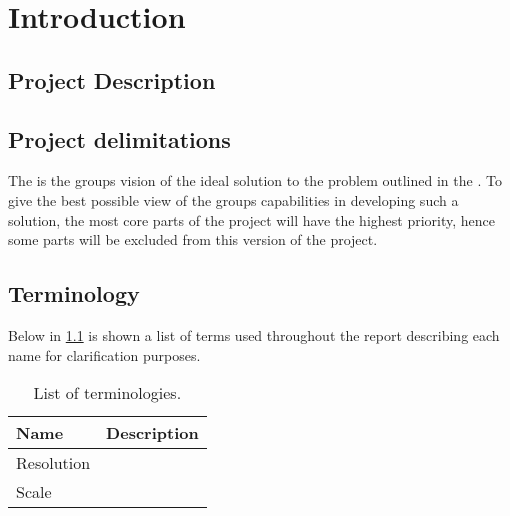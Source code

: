 
\chapter{Introduction}
\label{sec:introduction}


\section{Project Description}
\label{sec:projectDescription}


\section{Project delimitations}
\label{sec:delimitations}
The  is the groups vision of the ideal solution to the problem outlined in the .  
To give the best possible view of the groups capabilities in developing such a solution, the most core parts of the project will have the highest priority, hence some parts will be excluded from this version of the project. 

\section{Terminology}
\label{sec:terminology}
Below in \cref{tab:terminology} is shown a list of terms used throughout the report describing each name for clarification purposes.

\begin{table}[H]
	\centering
	\begin{tabularx}{0.8\textwidth}{l X}
		\toprule
		\textbf{Name} & \textbf{Description} \\
		\midrule
		Resolution & \\
		Scale & \\
		\bottomrule
	\end{tabularx}
	\caption{List of terminologies.}
	\label{tab:terminology}
\end{table}